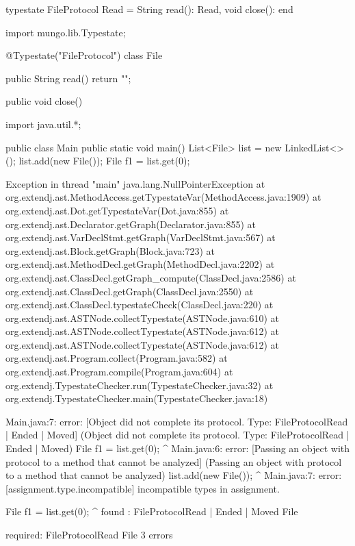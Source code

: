 \begin{code}
typestate FileProtocol {
  Read = {
    String read(): Read,
    void close(): end
  }
}\end{code}

\begin{code}
import mungo.lib.Typestate;

@Typestate("FileProtocol")
class File {

  public String read() {
    return "";
  }

  public void close() {
  }

}\end{code}

\begin{code}
import java.util.*;

public class Main {
  public static void main() {
    List<File> list = new LinkedList<>();
    list.add(new File());
    File f1 = list.get(0);
  }
}\end{code}

\lstset{language=,caption=Original Mungo output}
\begin{code}
Exception in thread "main" java.lang.NullPointerException
	at org.extendj.ast.MethodAccess.getTypestateVar(MethodAccess.java:1909)
	at org.extendj.ast.Dot.getTypestateVar(Dot.java:855)
	at org.extendj.ast.Declarator.getGraph(Declarator.java:855)
	at org.extendj.ast.VarDeclStmt.getGraph(VarDeclStmt.java:567)
	at org.extendj.ast.Block.getGraph(Block.java:723)
	at org.extendj.ast.MethodDecl.getGraph(MethodDecl.java:2202)
	at org.extendj.ast.ClassDecl.getGraph_compute(ClassDecl.java:2586)
	at org.extendj.ast.ClassDecl.getGraph(ClassDecl.java:2550)
	at org.extendj.ast.ClassDecl.typestateCheck(ClassDecl.java:220)
	at org.extendj.ast.ASTNode.collectTypestate(ASTNode.java:610)
	at org.extendj.ast.ASTNode.collectTypestate(ASTNode.java:612)
	at org.extendj.ast.ASTNode.collectTypestate(ASTNode.java:612)
	at org.extendj.ast.Program.collect(Program.java:582)
	at org.extendj.ast.Program.compile(Program.java:604)
	at org.extendj.TypestateChecker.run(TypestateChecker.java:32)
	at org.extendj.TypestateChecker.main(TypestateChecker.java:18)
\end{code}

\lstset{language=,caption=New Mungo output}
\begin{code}
Main.java:7: error: [Object did not complete its protocol. Type: FileProtocol{Read} | Ended | Moved] (Object did not complete its protocol. Type: FileProtocol{Read} | Ended | Moved)
    File f1 = list.get(0);
         ^
Main.java:6: error: [Passing an object with protocol to a method that cannot be analyzed] (Passing an object with protocol to a method that cannot be analyzed)
    list.add(new File());
             ^
Main.java:7: error: [assignment.type.incompatible] incompatible types in assignment.

    File f1 = list.get(0);
                      ^
  found   : FileProtocol{Read} | Ended | Moved File

  required: FileProtocol{Read} File
3 errors
\end{code}

